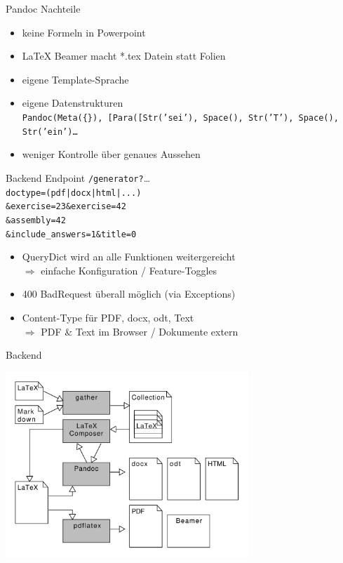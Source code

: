 \documentclass[english,hangout]{beamer}
\begin{document}
\begin{frame}{Pandoc Nachteile}
    \begin{itemize}
        \item keine Formeln in Powerpoint
        \item LaTeX Beamer macht *.tex Datein statt Folien
        \item eigene Template-Sprache
        \item eigene Datenstrukturen\\
            {\tiny \texttt{Pandoc(Meta(\{\}), [Para([Str('sei'), Space(), Str('T'), Space(), Str('ein')\dots } }
        \item weniger Kontrolle über genaues Aussehen
    \end{itemize}
\end{frame}


\begin{frame}{Backend Endpoint}
    \texttt{/generator?}\dots\\
    \quad\quad\quad\texttt{doctype=(pdf|docx|html|...)}\\
    \quad\quad\quad\texttt{\&exercise=23\&exercise=42}\\
    \quad\quad\quad\texttt{\&assembly=42}\\
    \quad\quad\quad\texttt{\&include\_answers=1\&title=0}\\
    \begin{itemize}
        \item QueryDict wird an alle Funktionen weitergereicht\\
            \quad $\Rightarrow$ einfache Konfiguration / Feature-Toggles
        \item 400 BadRequest überall möglich (via Exceptions)
        \item Content-Type für PDF, docx, odt, Text\\
            \quad $\Rightarrow$ PDF \& Text im Browser / Dokumente extern
    \end{itemize}
\end{frame}

\begin{frame}{Backend}
\begin{center}
\includegraphics[height=7cm]{backend.pdf}
\end{center}
\vspace{-6mm}
\end{frame}
\end{document}
